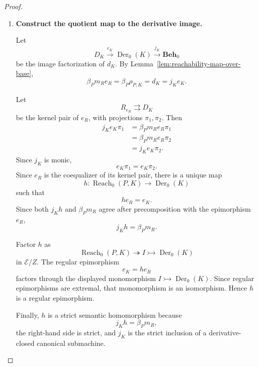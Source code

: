 \begin{proof}
\begin{enumerate}
        \item \textbf{Construct the quotient map to the derivative image.}

        Let
        \[
            D_K
                \xrightarrow{e_K}
            \operatorname{Der}_0(K)
                \xrightarrow{j_K}
            \mathbf{Beh}_0
        \]
        be the image factorization of \(d_K\). By
        Lemma~\ref{lem:reachability-map-over-base},
        \[
            \beta_Pm_Re_R
            =
            \beta_P\rho_{P,K}
            =
            d_K
            =
            j_Ke_K.
        \]

        Let
        \[
            R_{e_R}\rightrightarrows D_K
        \]
        be the kernel pair of \(e_R\), with projections
        \(\pi_1,\pi_2\). Then
        \[
            \begin{aligned}
                j_Ke_K\pi_1
                &=
                \beta_Pm_Re_R\pi_1
                \\
                &=
                \beta_Pm_Re_R\pi_2
                \\
                &=
                j_Ke_K\pi_2.
            \end{aligned}
        \]
        Since \(j_K\) is monic,
        \[
            e_K\pi_1=e_K\pi_2.
        \]
        Since \(e_R\) is the coequalizer of its kernel pair, there is a unique
        map
        \[
            h:
            \operatorname{Reach}_0(P,K)
            \to
            \operatorname{Der}_0(K)
        \]
        such that
        \[
            he_R=e_K.
        \]
        Since both \(j_Kh\) and \(\beta_Pm_R\) agree after precomposition with
        the epimorphism \(e_R\),
        \[
            j_Kh=\beta_Pm_R.
        \]

        Factor \(h\) as
        \[
            \operatorname{Reach}_0(P,K)
                \twoheadrightarrow
            I
                \rightarrowtail
            \operatorname{Der}_0(K)
        \]
        in \(\mathcal E/Z\). The regular epimorphism
        \[
            e_K=he_R
        \]
        factors through the displayed monomorphism \(I\rightarrowtail
        \operatorname{Der}_0(K)\). Since regular epimorphisms are extremal,
        that monomorphism is an isomorphism. Hence \(h\) is a regular
        epimorphism.

        Finally, \(h\) is a strict semantic homomorphism because
        \[
            j_Kh=\beta_Pm_R,
        \]
        the right-hand side is strict, and \(j_K\) is the strict inclusion of
        a derivative-closed canonical submachine.
    \end{enumerate}
\end{proof}

